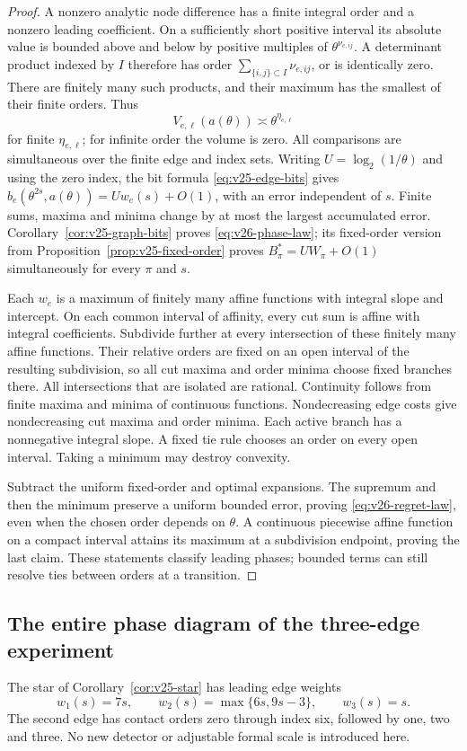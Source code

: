 \begin{proof}
A nonzero analytic node difference has a finite integral order and a
nonzero leading coefficient. On a sufficiently short positive interval
its absolute value is bounded above and below by positive multiples
of $\theta^{\nu_{e,ij}}$. A determinant product indexed by $I$
therefore has order $\sum_{\{i,j\}\subset I}\nu_{e,ij}$, or is
identically zero. There are finitely many such products, and their
maximum has the smallest of their finite orders. Thus
\[
 V_{e,\ell}(a(\theta))\asymp\theta^{\eta_{e,\ell}}
\]
for finite $\eta_{e,\ell}$; for infinite order the volume is zero.
All comparisons are simultaneous over the finite edge and index sets.
Writing $U=\log_2(1/\theta)$ and using the zero index, the bit formula
\eqref{eq:v25-edge-bits} gives
$b_e(\theta^{2s},a(\theta))=Uw_e(s)+O(1)$, with an error independent
of $s$. Finite sums, maxima and minima change by at most the largest
accumulated error. Corollary~\ref{cor:v25-graph-bits} proves
\eqref{eq:v26-phase-law}; its fixed-order version from
Proposition~\ref{prop:v25-fixed-order} proves
$B_\pi^*=UW_\pi+O(1)$ simultaneously for every $\pi$ and $s$.

Each $w_e$ is a maximum of finitely many affine functions with integral
slope and intercept. On each common interval of affinity, every cut
sum is affine with integral coefficients. Subdivide further at every
intersection of these finitely many affine functions. Their relative
orders are fixed on an open interval of the resulting subdivision,
so all cut maxima and order minima choose fixed branches there.
All intersections that are isolated are rational. Continuity follows
from finite maxima and minima of continuous functions. Nondecreasing
edge costs give nondecreasing cut maxima and order minima. Each active
branch has a nonnegative integral slope. A fixed tie rule chooses an
order on every open interval. Taking a minimum may destroy convexity.

Subtract the uniform fixed-order and optimal expansions. The supremum
and then the minimum preserve a uniform bounded error, proving
\eqref{eq:v26-regret-law}, even when the chosen order depends on
$\theta$. A continuous piecewise affine function on a compact interval
attains its maximum at a subdivision endpoint, proving the last claim.
These statements classify leading phases; bounded terms can still
resolve ties between orders at a transition.
\end{proof}

\subsection{The entire phase diagram of the three-edge experiment}
The star of Corollary~\ref{cor:v25-star} has leading edge weights
\[
       w_1(s)=7s,\qquad w_2(s)=\max\{6s,9s-3\},\qquad w_3(s)=s.
\]
The second edge has contact orders zero through index six, followed by
one, two and three. No new detector or adjustable formal scale is
introduced here.

